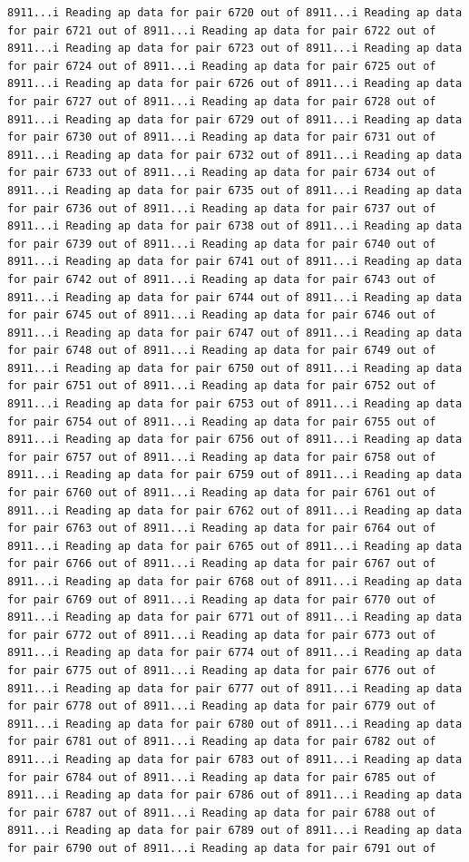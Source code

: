 \documentclass[
]{article}
\begin{document}
\begin{verbatim}
8911...i Reading ap data for pair 6720 out of 8911...i Reading ap data for pair 6721 out of 8911...i Reading ap data for pair 6722 out of 8911...i Reading ap data for pair 6723 out of 8911...i Reading ap data for pair 6724 out of 8911...i Reading ap data for pair 6725 out of 8911...i Reading ap data for pair 6726 out of 8911...i Reading ap data for pair 6727 out of 8911...i Reading ap data for pair 6728 out of 8911...i Reading ap data for pair 6729 out of 8911...i Reading ap data for pair 6730 out of 8911...i Reading ap data for pair 6731 out of 8911...i Reading ap data for pair 6732 out of 8911...i Reading ap data for pair 6733 out of 8911...i Reading ap data for pair 6734 out of 8911...i Reading ap data for pair 6735 out of 8911...i Reading ap data for pair 6736 out of 8911...i Reading ap data for pair 6737 out of 8911...i Reading ap data for pair 6738 out of 8911...i Reading ap data for pair 6739 out of 8911...i Reading ap data for pair 6740 out of 8911...i Reading ap data for pair 6741 out of 8911...i Reading ap data for pair 6742 out of 8911...i Reading ap data for pair 6743 out of 8911...i Reading ap data for pair 6744 out of 8911...i Reading ap data for pair 6745 out of 8911...i Reading ap data for pair 6746 out of 8911...i Reading ap data for pair 6747 out of 8911...i Reading ap data for pair 6748 out of 8911...i Reading ap data for pair 6749 out of 8911...i Reading ap data for pair 6750 out of 8911...i Reading ap data for pair 6751 out of 8911...i Reading ap data for pair 6752 out of 8911...i Reading ap data for pair 6753 out of 8911...i Reading ap data for pair 6754 out of 8911...i Reading ap data for pair 6755 out of 8911...i Reading ap data for pair 6756 out of 8911...i Reading ap data for pair 6757 out of 8911...i Reading ap data for pair 6758 out of 8911...i Reading ap data for pair 6759 out of 8911...i Reading ap data for pair 6760 out of 8911...i Reading ap data for pair 6761 out of 8911...i Reading ap data for pair 6762 out of 8911...i Reading ap data for pair 6763 out of 8911...i Reading ap data for pair 6764 out of 8911...i Reading ap data for pair 6765 out of 8911...i Reading ap data for pair 6766 out of 8911...i Reading ap data for pair 6767 out of 8911...i Reading ap data for pair 6768 out of 8911...i Reading ap data for pair 6769 out of 8911...i Reading ap data for pair 6770 out of 8911...i Reading ap data for pair 6771 out of 8911...i Reading ap data for pair 6772 out of 8911...i Reading ap data for pair 6773 out of 8911...i Reading ap data for pair 6774 out of 8911...i Reading ap data for pair 6775 out of 8911...i Reading ap data for pair 6776 out of 8911...i Reading ap data for pair 6777 out of 8911...i Reading ap data for pair 6778 out of 8911...i Reading ap data for pair 6779 out of 8911...i Reading ap data for pair 6780 out of 8911...i Reading ap data for pair 6781 out of 8911...i Reading ap data for pair 6782 out of 8911...i Reading ap data for pair 6783 out of 8911...i Reading ap data for pair 6784 out of 8911...i Reading ap data for pair 6785 out of 8911...i Reading ap data for pair 6786 out of 8911...i Reading ap data for pair 6787 out of 8911...i Reading ap data for pair 6788 out of 8911...i Reading ap data for pair 6789 out of 8911...i Reading ap data for pair 6790 out of 8911...i Reading ap data for pair 6791 out of 
\end{verbatim}
\end{document}

